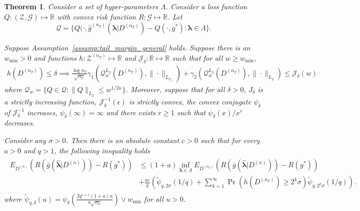 \documentclass[10pt]{book}
\newtheorem{theorem}{Theorem}
\theoremstyle{definition}
\begin{document}
\begin{theorem}
	\label{thrm:jean_cv}
	Consider a set of hyper-parameters $\Lambda$. Consider a loss function $Q:(\mathcal{Z}, \mathcal{G}) \mapsto \mathbb{R}$ with convex risk function $R: \mathcal{G} \mapsto \mathbb{R}$. Let
	$$
	\mathcal{Q} = \{ 
	Q(\cdot, \hat{g}^{(n_T)}(\boldsymbol{\lambda} | D^{(n_T)}) - Q(\cdot, g^*) : \boldsymbol{\lambda} \in \Lambda \}.
	$$
	
	Suppose Assumption~\ref{assump:tail_margin_general} holds.
	Suppose there is an $w_{\min} > 0$ and
	functions $h: {\mathcal{Z}}^{(n_T)} \mapsto \mathbb{R}$
	and $\mathcal{J}_\delta: \mathbb{R}\mapsto \mathbb{R}$ such that
	for all $w \ge w_{\min}$,
	\begin{align}
	\label{eq:h_to_J}
	h(D^{(n_{T})})\le\delta\implies
	\frac{\log n_{V}}{\sqrt{n_{V}}}
	\gamma_{1}\left(\mathcal{Q}_{w}^{L_{2}}(D^{(n_{T})}),\|\cdot\|_{L_{\psi_{1}}}\right)
	+\gamma_{2}\left(\mathcal{Q}_{w}^{L_{2}}(D^{(n_{T})}),\|\cdot\|_{L_{2}}\right)\le \mathcal{J}_{\delta}(w)
	\end{align}
	where $\mathcal{Q}_w = \{Q \in \mathcal{Q}: \| Q \|_{L_2} \le w^{1/2\kappa} \}$.
	Moreover, suppose that for all $\delta > 0$, $J_\delta$ is a strictly increasing function, $\mathcal{J}_\delta^{-1}(\epsilon)$ is strictly convex,
	the convex conjugate $\psi_\delta$ of $\mathcal{J}^{-1}_\delta$ increases, $\psi_\delta(\infty ) = \infty$ and there exists $r \ge 1$ such that $\psi_\delta(x)/x^r$ decreases.
	
	Consider any $\sigma > 0$. Then there is an absolute constant $c > 0$ such that for every $a > 0$ and $q > 1$, the following inequality holds
	\begin{align}
	\begin{split}
	E_{D^{(n)}} 
	\left(
	R\left(\bar{g} ( \hat{\boldsymbol \lambda} | {D^{(n)}} ) \right )
	- R (g^*)
	\right)
	&\le
	(1+a) \inf_{\boldsymbol{\lambda} \in \Lambda} 
	E_{D^{(n_T)}}
	\left(
	R\left(\bar{g} ( \hat{\boldsymbol \lambda} | {D^{(n)}} ) \right )
	- R (g^*)
	\right)
	\\
	& +
	\frac{ac}{q}
	\left(
	\tilde{\psi}_{q,2\sigma}(1/q)
	+\sum_{k=1}^{\infty}
	\Pr\left(h\left(D^{(n_{T})}\right)\ge2^{k}\sigma\right)
	\tilde{\psi}_{q,2^{k}\sigma}(1/q)
	\right).
	\label{eq:cv_oracle_ineq}
	\end{split}
	\end{align}
	where $\tilde{\psi}_{q, \delta}(u) = \psi_\delta\left(\frac{2q^{r+1}(1 + a)u}{a\sqrt{n_V}}\right) \vee w_{\min}$ for all $u > 0$.
\end{theorem}
\end{document}
